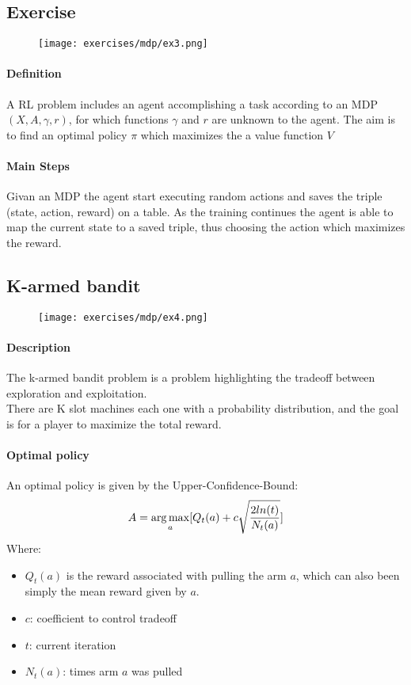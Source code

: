 \subsection{Exercise}

\begin{figure}[H]
    \centering
    \texttt{[image: exercises/mdp/ex3.png]}
\end{figure}

\paragraph{Definition}
A RL problem includes an agent accomplishing a task according to an  MDP $(X, A, \gamma, r )$, for which functions $\gamma$ and $r$ are unknown to the agent. The aim is to find an optimal policy $\pi$ which maximizes the a value function $V$ 

\paragraph{Main Steps}
Givan an MDP the agent start executing random actions and saves the triple (state, action, reward) on a table. As the training continues the agent is able to map the current state to a saved triple, thus choosing the action which maximizes the reward.\\

\subsection{K-armed bandit}

\begin{figure}[H]
    \centering
    \texttt{[image: exercises/mdp/ex4.png]}
\end{figure}

\paragraph{Description}
The k-armed bandit problem is a problem highlighting the tradeoff between exploration and exploitation.\\
There are K slot machines each one with a probability distribution, and the goal is for a player to maximize the total reward.

\paragraph{Optimal policy}
An optimal policy is given by the Upper-Confidence-Bound:
$$A=\operatorname*{arg\,max}_a[Q_t(a)+c\sqrt{\frac{2ln(t)}{N_t(a)}}]$$
Where:
\begin{itemize}
\item $Q_t(a)$ is the reward associated with pulling the arm $a$, which can also been simply the mean reward given by $a$.
\item $c$: coefficient to control tradeoff
\item $t$: current iteration
\item $N_t(a)$: times arm $a$ was pulled
\end{itemize}




